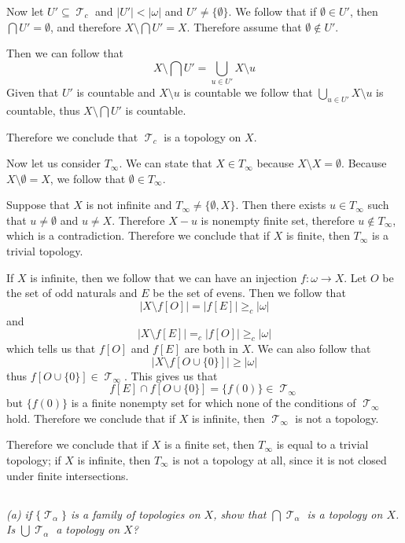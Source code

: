 \documentclass[11pt,oneside,titlepage]{book}
\DeclareMathOperator \topol {\mathcal {T}}
\begin{document}
Now let $U' \subseteq \topol_c$ and $|U'| < |\omega|$ and $U' \neq \{\emptyset\}$.
We follow that if $\emptyset \in U'$, then $\bigcap{U'} = \emptyset$, and therefore
$X \setminus \bigcap{U'} = X$. Therefore assume that $\emptyset \notin U'$.

Then we can follow that
$$X \setminus \bigcap{U'} = \bigcup_{u \in U'}{X \setminus u}$$
Given that $U'$ is countable and $X \setminus u$ is countable we follow that
$\bigcup_{u \in U'}{X \setminus u}$ is countable, thus $X \setminus \bigcap{U'}$ is countable.

Therefore we conclude that $\topol_c$ is a topology on $X$.

Now let us consider $T_\infty$. We can state that $X \in T_\infty$ because
$X \setminus X = \emptyset$. Because $X \setminus \emptyset = X$, we follow that
$\emptyset \in T_\infty$.

Suppose that $X$ is not infinite and $T_\infty \neq \{\emptyset, X\}$. Then there exists
$u \in T_\infty$ such that $u \neq \emptyset$ and $u \neq X$. Therefore $X - u$ is
nonempty finite set, therefore $u \notin T_\infty$, which is a contradiction.
Therefore we conclude that if $X$ is finite, then $T_\infty$ is a trivial topology.

If $X$ is infinite, then we follow that we can have an injection $f: \omega \to X$.
Let $O$ be the set of odd naturals and $E$ be the set of evens. Then we follow that
$$|X \setminus f[O]| = |f[E]| \geq_c |\omega|$$
and
$$|X \setminus f[E]| =_c |f[O]| \geq_c |\omega|$$
which tells us that $f[O]$ and $f[E]$ are both in $X$. We can also follow that
$$|X \setminus f[O \cup \{0\}]| \geq |\omega|$$
thus $ f[O \cup \{0\}] \in \topol_\infty$. This gives us that
$$f[E] \cap f[O \cup \{0\}] = \{f(0)\} \in \topol_\infty$$
but $\{f(0)\}$ is a finite nonempty set for which none of the conditions of $\topol_\infty$
hold. Therefore we conclude that if $X$ is infinite, then $\topol_\infty$ is not a topology.

Therefore we conclude that if $X$ is a finite set, then $T_\infty$ is equal to a
trivial topology; if $X$ is infinite, then $T_\infty$ is not a topology at all, since
it is not closed under finite intersections.

\subsection{}

\textit{(a) if $\{\topol_\alpha\}$ is a family of topologies on $X$, show that
  $\bigcap{\topol_\alpha}$ is a topology on $X$. Is $\bigcup{\topol_\alpha}$ a topology on $X$?}
\end{document}
